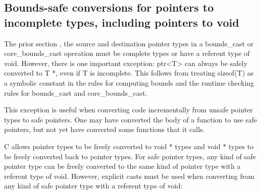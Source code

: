 \protect\hypertarget{ux5fToc424307715}{}{}

\subsection{\texorpdfstring{\protect\hypertarget{ux5fToc437460802}{}{\protect\hypertarget{ux5fToc440445483}{}{\protect\hypertarget{ux5fToc440449265}{}{\protect\hypertarget{ux5fToc440551915}{}{\protect\hypertarget{ux5fToc426641112}{}{\protect\hypertarget{ux5fToc435434971}{}{}}}}}}Bounds-safe
conversions for pointers to incomplete types, including pointers to
void}{Bounds-safe conversions for pointers to incomplete types, including pointers to void}}\label{bounds-safe-conversions-for-pointers-to-incomplete-types-including-pointers-to-void}

The prior section , the source and destination pointer types in a
bounds\_cast or core\_bounds\_cast operation must be complete types or
have a referent type of void. However, there is one important exception:
ptr\textless{}T\textgreater{} can always be safely converted to T *,
even if T is incomplete. This follows from treating sizeof(T) as a
symbolic constant in the rules for computing bounds and the runtime
checking rules for bounds\_cast and core\_bounds\_cast.

This exception is useful when converting code incrementally from unsafe
pointer types to safe pointers. One may have converted the body of a
function to use safe pointers, but not yet have converted some functions
that it calls.

C allows pointer types to be freely converted to void * types and void *
types to be freely converted back to pointer types. For safe pointer
types, any kind of safe pointer type can be freely converted to the same
kind of pointer type with a referent type of void. However, explicit
casts must be used when converting from any kind of safe pointer type
with a referent type of void:

